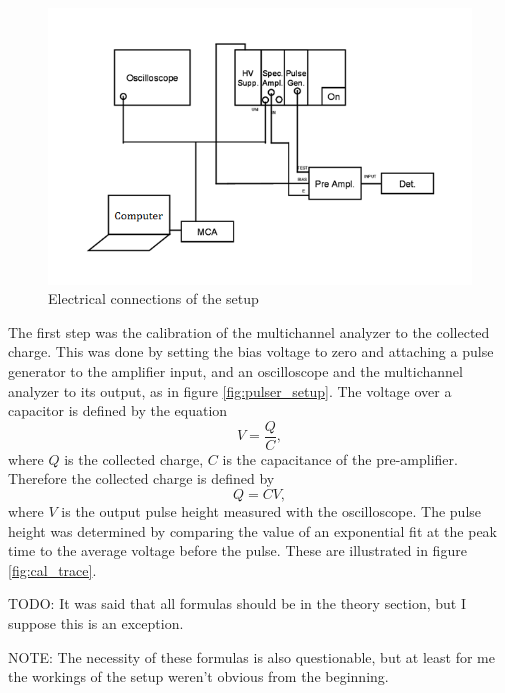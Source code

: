 \documentclass[a4paper]{article}
\begin{document}
\begin{figure}[ht!]
\centering
\includegraphics[width=\textwidth]{fig/instructions/connections.png}
\caption{Electrical connections of the setup \cite{instructions}}
\label{fig:connections}
\end{figure}

\FloatBarrier
The first step was the calibration of the multichannel analyzer to the collected charge.
This was done by setting the bias voltage to zero and attaching a pulse generator to the amplifier input, and an oscilloscope and the multichannel analyzer to its output, as in figure \ref{fig:pulser_setup}.
The voltage over a capacitor is defined by the equation
\begin{equation}
V = \frac{Q}{C},
\end{equation}
where $Q$ is the collected charge, $C$ is the capacitance of the pre-amplifier.
Therefore the collected charge is defined by
\begin{equation}
Q = CV,
\end{equation}
where $V$ is the output pulse height measured with the oscilloscope.
The pulse height was determined by comparing the value of an exponential fit at the peak time to the average voltage before the pulse.
These are illustrated in figure \ref{fig:cal_trace}.

TODO: It was said that all formulas should be in the theory section, but I suppose this is an exception.

NOTE: The necessity of these formulas is also questionable, but at least for me the workings of the setup weren't obvious from the beginning.
\end{document}
